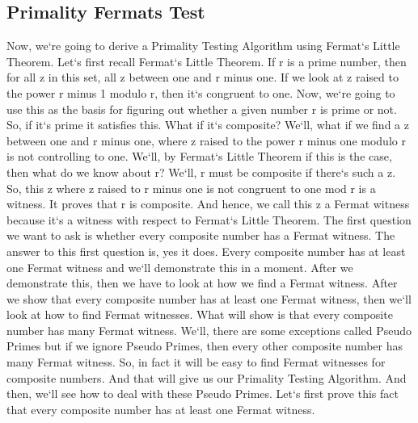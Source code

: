 \subsection{Primality  Fermats Test}
Now, we`re going to derive a Primality Testing Algorithm using Fermat`s Little Theorem.
Let`s first recall Fermat`s Little Theorem.
If r is a prime number, then for all z in this set, all z between one and r minus one.
If we look at z raised to the power r minus 1 modulo r, then it`s congruent to one.
Now, we`re going to use this as the basis for figuring out whether a given number r is prime or not.
So, if it`s prime it satisfies this.
What if it`s composite? We`ll, what if we find a z between one and r minus one, where z raised to the power r minus one modulo r is not controlling to one.
We`ll, by Fermat`s Little Theorem if this is the case, then what do we know about r? We`ll, r must be composite if there`s such a z.
So, this z where z raised to r minus one is not congruent to one mod r is a witness.
It proves that r is composite.
And hence, we call this z a Fermat witness because it`s a witness with respect to Fermat`s Little Theorem.
The first question we want to ask is whether every composite number has a Fermat witness.
The answer to this first question is, yes it does.
Every composite number has at least one Fermat witness and we`ll demonstrate this in a moment.
After we demonstrate this, then we have to look at how we find a Fermat witness.
After we show that every composite number has at least one Fermat witness, then we`ll look at how to find Fermat witnesses.
What will show is that every composite number has many Fermat witness.
We`ll, there are some exceptions called Pseudo Primes but if we ignore Pseudo Primes, then every other composite number has many Fermat witness.
So, in fact it will be easy to find Fermat witnesses for composite numbers.
And that will give us our Primality Testing Algorithm.
And then, we`ll see how to deal with these Pseudo Primes.
Let`s first prove this fact that every composite number has at least one Fermat witness.


